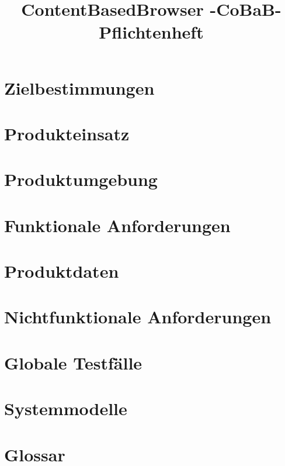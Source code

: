 \documentclass[parskip=full]{scrartcl}
\title{ContentBasedBrowser -CoBaB- \\ Pflichtenheft}
\begin{document}
\maketitle

\section{Zielbestimmungen}


\section{Produkteinsatz}


\section{Produktumgebung}


\section{Funktionale Anforderungen}


\section{Produktdaten}


\section{Nichtfunktionale Anforderungen}


\section{Globale Testf\"alle}


\section{Systemmodelle}


\section{Glossar}

\end{document}
